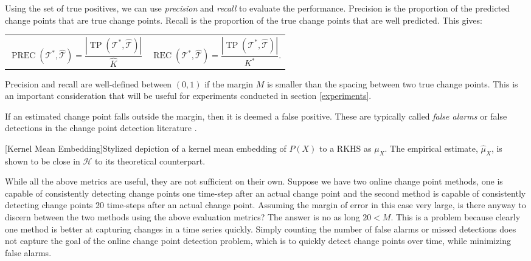 Using the set of true positives, we can use \textit{precision} and \textit{recall} to evaluate the performance. Precision is the proportion of the predicted change points that are true change points. Recall is the proportion of the true change points that are well predicted. This gives:

\noindent
\begin{tabularx}{\linewidth}{@{}XX@{}}
\begin{equation}
\operatorname{PREC}(\mathcal{T}^{*}, \hat{\mathcal{T}})=\frac{|\operatorname{TP}(\mathcal{T}^{*}, \hat{\mathcal{T}})|} {\hat{K}}
\end{equation}
&
\begin{equation}
\operatorname{REC}(\mathcal{T}^{*}, \hat{\mathcal{T}})=\frac{|\operatorname{TP}(\mathcal{T}^{*}, \hat{\mathcal{T}})|} {K^*}.
\end{equation}
\end{tabularx}
Precision and recall are well-defined between $(0,1)$ if the margin $M$ is smaller than the spacing between two true change points. This is an important consideration that will be useful for experiments conducted in section \ref{experiments}.

If an estimated change point falls outside the margin, then it is deemed a false positive. These are typically called \textit{false alarms} or false detections in the change point detection literature \cite{lee2010change}.

\begin{center} 
[Kernel Mean Embedding]{Stylized depiction of a kernel mean embedding of $P(X)$ to a RKHS as $\mu_X$. The empirical estimate, $\hat{\mu}_X$, is shown to be close in $\mathcal{H}$ to its theoretical counterpart.} 
\label{fig:changepoints} 
\end{center}

While all the above metrics are useful, they are not sufficient on their own. Suppose we have two online change point methods, one is capable of consistently detecting change points one time-step after an actual change point and the second method is capable of consistently detecting change points 20 time-steps after an actual change point. Assuming the margin of error in this case very large, is there anyway to discern between the two methods using the above evaluation metrics?  The answer is no as long $20 < M$. This is a problem because clearly one method is better at capturing changes in a time series quickly. Simply counting the number of false alarms or missed detections does not capture the goal of the online change point detection problem, which is to quickly detect change points over time, while minimizing false alarms. 
 
